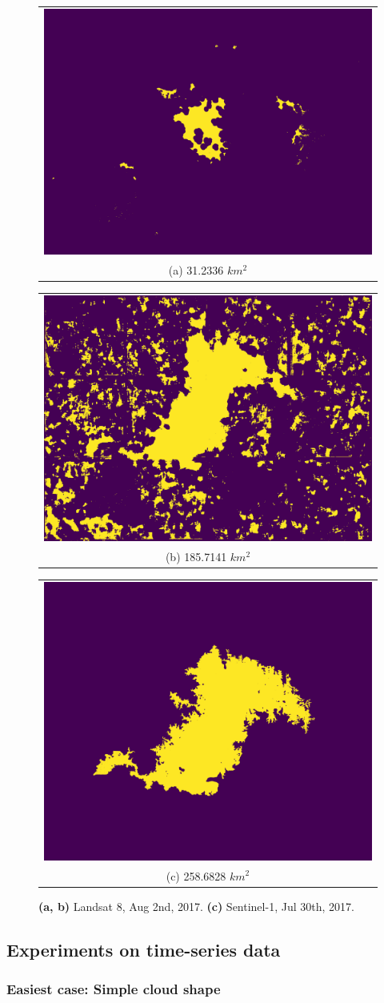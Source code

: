 \begin{figure}[h!]
    \begin{center}
        \begin{tabular}[b]{c}
            \includegraphics[width=0.3\linewidth]{figures/raw20170802_31_2336.png} \\
            \small (a) 31.2336 $km^2$
          \end{tabular}
          \begin{tabular}[b]{c}
            \includegraphics[width=0.3\linewidth]{figures/r20170802_185_7141.png} \\
            \small (b) 185.7141 $km^2$
          \end{tabular}
          \begin{tabular}[b]{c}
              \includegraphics[width=0.3\linewidth]{figures/20170730_258_6828.png} \\
              \small (c) 258.6828 $km^2$
          \end{tabular} 
    \end{center}
    \caption{
		\textbf{(a, b)} Landsat 8, Aug 2nd, 2017.
		\textbf{(c)} Sentinel-1, Jul 30th, 2017.}
\end{figure}


\subsection{Experiments on time-series data}

\subsubsection{Easiest case: Simple cloud shape}

